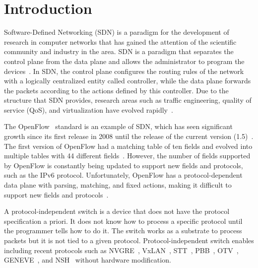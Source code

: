 \section{Introduction}
\label{sec:intro}

Software-Defined Networking (SDN) is a paradigm for the development of research in computer networks that has gained the attention of the scientific community and industry in the area. SDN is a paradigm that separates the control plane from the data plane and allows the administrator to program the devices~\cite{ProgrammableNetworks2015}. In SDN, the control plane configures the routing rules of the network with a logically centralized entity called controller, while the data plane forwards the packets according to the actions defined by this controller. Due to the structure that SDN provides, research areas such as traffic engineering, quality of service (QoS), and virtualization have evolved rapidly~\cite{stubbe2017p4}.

The OpenFlow~\cite{McKeown:2008:OpenFlow} standard is an example of SDN, which has seen significant growth since its first release in 2008 until the release of the current version (1.5)~\cite{ChristianSurveySDN2015}. The first version of OpenFlow had a matching table of ten fields and evolved into multiple tables with 44 different fields~\cite{ChristianSurveySDN2015}. However, the number of fields supported by OpenFlow is constantly being updated to support new fields and protocols, such as the IPv6 protocol. Unfortunately, OpenFlow has a protocol-dependent data plane with parsing, matching, and fixed actions, making it difficult to support new fields and protocols~\cite{Jouet:2017:BPFabric}.

A protocol-independent switch is a device that does not have the protocol specification a priori. It does not know how to process a specific protocol until the programmer tells how to do it. The switch works as a substrate to process packets but it is not tied to a given protocol. Protocol-independent switch enables including recent protocols such as NVGRE~\cite{rfc7637}, VxLAN~\cite{mahalingam2013}, STT~\cite{davie2014stt}, PBB~\cite{kishjac-bmwg-evpntest-08}, OTV~\cite{hasmit-otv-04}, GENEVE~\cite{ietf-nvo3-geneve-05}, and NSH~\cite{rfc8300} without hardware modification.

